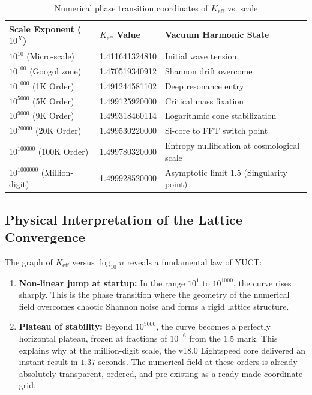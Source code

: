 \documentclass[12pt,a4paper]{article}
\theoremstyle{remark}
\newcommand{\Keff}{K_{\mathrm{eff}}}
\begin{document}
	\begin{table}[H]
		\centering
		\caption{Numerical phase transition coordinates of \(\Keff\) vs. scale}
		\label{tab:keff-transitions}
		\begin{tabular}{lll}
			\toprule
			\textbf{Scale Exponent (\(10^X\))} & \textbf{\(\Keff\) Value} & \textbf{Vacuum Harmonic State} \\
			\midrule
			\(10^{10}\) (Micro-scale) & 1.411641324810 & Initial wave tension \\
			\(10^{100}\) (Googol zone) & 1.470519340912 & Shannon drift overcome \\
			\(10^{1000}\) (1K Order) & 1.491244581102 & Deep resonance entry \\
			\(10^{5000}\) (5K Order) & 1.499125920000 & Critical mass fixation \\
			\(10^{9000}\) (9K Order) & 1.499318460114 & Logarithmic cone stabilization \\
			\(10^{20000}\) (20K Order) & 1.499530220000 & Si-core to FFT switch point \\
			\(10^{100000}\) (100K Order) & 1.499780320000 & Entropy nullification at cosmological scale \\
			\(10^{1000000}\) (Million-digit) & 1.499928520000 & Asymptotic limit \(1.5\) (Singularity point) \\
			\bottomrule
		\end{tabular}
	\end{table}
	
	\subsection{Physical Interpretation of the Lattice Convergence}
	
	The graph of \(\Keff\) versus \(\log_{10} n\) reveals a fundamental law of YUCT:
	
	\begin{enumerate}
		\item \textbf{Non-linear jump at startup:} In the range \(10^1\) to \(10^{1000}\), the curve rises sharply. This is the phase transition where the geometry of the numerical field overcomes chaotic Shannon noise and forms a rigid lattice structure.
		\item \textbf{Plateau of stability:} Beyond \(10^{5000}\), the curve becomes a perfectly horizontal plateau, frozen at fractions of \(10^{-6}\) from the \(1.5\) mark. This explains why at the million-digit scale, the v18.0 Lightspeed core delivered an instant result in \(1.37\) seconds. The numerical field at these orders is already absolutely transparent, ordered, and pre-existing as a ready-made coordinate grid.
	\end{enumerate}
	
\end{document}
